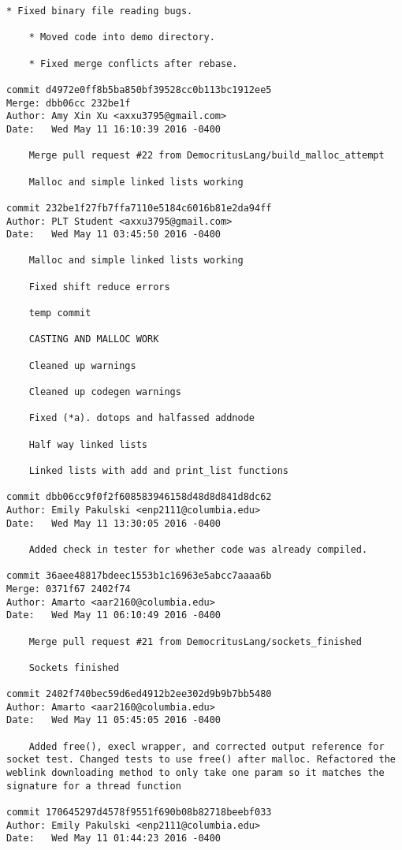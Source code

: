 \begin{lstlisting}[backgroundcolor=\color{white}]
    * Fixed binary file reading bugs.
    
    * Moved code into demo directory.
    
    * Fixed merge conflicts after rebase.

commit d4972e0ff8b5ba850bf39528cc0b113bc1912ee5
Merge: dbb06cc 232be1f
Author: Amy Xin Xu <axxu3795@gmail.com>
Date:   Wed May 11 16:10:39 2016 -0400

    Merge pull request #22 from DemocritusLang/build_malloc_attempt
    
    Malloc and simple linked lists working

commit 232be1f27fb7ffa7110e5184c6016b81e2da94ff
Author: PLT Student <axxu3795@gmail.com>
Date:   Wed May 11 03:45:50 2016 -0400

    Malloc and simple linked lists working
    
    Fixed shift reduce errors
    
    temp commit
    
    CASTING AND MALLOC WORK
    
    Cleaned up warnings
    
    Cleaned up codegen warnings
    
    Fixed (*a). dotops and halfassed addnode
    
    Half way linked lists
    
    Linked lists with add and print_list functions

commit dbb06cc9f0f2f608583946158d48d8d841d8dc62
Author: Emily Pakulski <enp2111@columbia.edu>
Date:   Wed May 11 13:30:05 2016 -0400

    Added check in tester for whether code was already compiled.

commit 36aee48817bdeec1553b1c16963e5abcc7aaaa6b
Merge: 0371f67 2402f74
Author: Amarto <aar2160@columbia.edu>
Date:   Wed May 11 06:10:49 2016 -0400

    Merge pull request #21 from DemocritusLang/sockets_finished
    
    Sockets finished

commit 2402f740bec59d6ed4912b2ee302d9b9b7bb5480
Author: Amarto <aar2160@columbia.edu>
Date:   Wed May 11 05:45:05 2016 -0400

    Added free(), execl wrapper, and corrected output reference for socket test. Changed tests to use free() after malloc. Refactored the weblink downloading method to only take one param so it matches the signature for a thread function

commit 170645297d4578f9551f690b08b82718beebf033
Author: Emily Pakulski <enp2111@columbia.edu>
Date:   Wed May 11 01:44:23 2016 -0400


\end{lstlisting}
